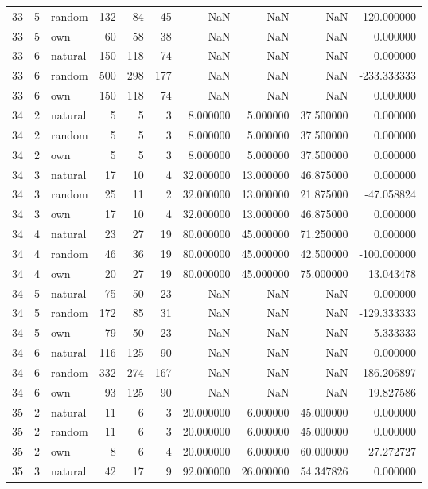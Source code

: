 \begin{table}[htbp]
\begin{tabular}{rrlrrrrrrr}
33 & 5 & random & 132 & 84 & 45 & NaN & NaN & NaN & -120.000000 \\
33 & 5 & own & 60 & 58 & 38 & NaN & NaN & NaN & 0.000000 \\
33 & 6 & natural & 150 & 118 & 74 & NaN & NaN & NaN & 0.000000 \\
33 & 6 & random & 500 & 298 & 177 & NaN & NaN & NaN & -233.333333 \\
33 & 6 & own & 150 & 118 & 74 & NaN & NaN & NaN & 0.000000 \\
34 & 2 & natural & 5 & 5 & 3 & 8.000000 & 5.000000 & 37.500000 & 0.000000 \\
34 & 2 & random & 5 & 5 & 3 & 8.000000 & 5.000000 & 37.500000 & 0.000000 \\
34 & 2 & own & 5 & 5 & 3 & 8.000000 & 5.000000 & 37.500000 & 0.000000 \\
34 & 3 & natural & 17 & 10 & 4 & 32.000000 & 13.000000 & 46.875000 & 0.000000 \\
34 & 3 & random & 25 & 11 & 2 & 32.000000 & 13.000000 & 21.875000 & -47.058824 \\
34 & 3 & own & 17 & 10 & 4 & 32.000000 & 13.000000 & 46.875000 & 0.000000 \\
34 & 4 & natural & 23 & 27 & 19 & 80.000000 & 45.000000 & 71.250000 & 0.000000 \\
34 & 4 & random & 46 & 36 & 19 & 80.000000 & 45.000000 & 42.500000 & -100.000000 \\
34 & 4 & own & 20 & 27 & 19 & 80.000000 & 45.000000 & 75.000000 & 13.043478 \\
34 & 5 & natural & 75 & 50 & 23 & NaN & NaN & NaN & 0.000000 \\
34 & 5 & random & 172 & 85 & 31 & NaN & NaN & NaN & -129.333333 \\
34 & 5 & own & 79 & 50 & 23 & NaN & NaN & NaN & -5.333333 \\
34 & 6 & natural & 116 & 125 & 90 & NaN & NaN & NaN & 0.000000 \\
34 & 6 & random & 332 & 274 & 167 & NaN & NaN & NaN & -186.206897 \\
34 & 6 & own & 93 & 125 & 90 & NaN & NaN & NaN & 19.827586 \\
35 & 2 & natural & 11 & 6 & 3 & 20.000000 & 6.000000 & 45.000000 & 0.000000 \\
35 & 2 & random & 11 & 6 & 3 & 20.000000 & 6.000000 & 45.000000 & 0.000000 \\
35 & 2 & own & 8 & 6 & 4 & 20.000000 & 6.000000 & 60.000000 & 27.272727 \\
35 & 3 & natural & 42 & 17 & 9 & 92.000000 & 26.000000 & 54.347826 & 0.000000 \\

\end{tabular}
\end{table}
